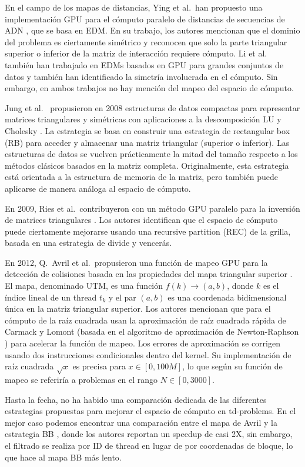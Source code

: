 \documentclass[twocolumn,10pt,a4paper]{article}
\begin{document}
En el campo de los mapas de distancias, Ying et al.\ han propuesto una
implementación GPU para el cómputo paralelo de distancias de secuencias de
ADN \cite{ref17}, que se basa en EDM. En su trabajo, los autores mencionan
que el dominio del problema es ciertamente simétrico y reconocen que solo la
parte triangular superior o inferior de la matriz de interacción requiere
cómputo. Li et al.\ \cite{ref8} también han trabajado en EDMs basados en GPU
para grandes conjuntos de datos y también han identificado la simetría
involucrada en el cómputo. Sin embargo, en ambos trabajos no hay mención del
mapeo del espacio de cómputo.

Jung et al.\ \cite{ref5} propusieron en 2008 estructuras de datos compactas
para representar matrices triangulares y simétricas con aplicaciones a la
descomposición LU y Cholesky \cite{ref4}. La estrategia se basa en construir
una estrategia de rectangular box (RB) para acceder y almacenar una matriz
triangular (superior o inferior). Las estructuras de datos se vuelven
prácticamente la mitad del tamaño respecto a los métodos clásicos basados en
la matriz completa. Originalmente, esta estrategia está orientada a la
estructura de memoria de la matriz, pero también puede aplicarse de manera
análoga al espacio de cómputo.

En 2009, Ries et al.\ contribuyeron con un método GPU paralelo para la
inversión de matrices triangulares \cite{ref16}. Los autores identifican que
el espacio de cómputo puede ciertamente mejorarse usando una recursive
partition (REC) de la grilla, basada en una estrategia de divide y vencerás.

En 2012, Q.~Avril et al.\ propusieron una función de mapeo GPU para la
detección de colisiones basada en las propiedades del mapa triangular superior
\cite{ref1}. El mapa, denominado UTM, es una función
$f(k) \rightarrow (a, b)$, donde $k$ es el índice lineal de un thread $t_k$
y el par $(a, b)$ es una coordenada bidimensional única en la matriz
triangular superior. Los autores mencionan que para el cómputo de la raíz
cuadrada usan la aproximación de raíz cuadrada rápida de Carmack y Lomont
(basada en el algoritmo de aproximación de Newton-Raphson \cite{ref15}) para
acelerar la función de mapeo. Los errores de aproximación se corrigen
usando dos instrucciones condicionales dentro del kernel. Su implementación
de raíz cuadrada $\sqrt{x}$ es precisa para $x \in [0, 100M]$, lo que según
su función de mapeo se referiría a problemas en el rango $N \in [0, 3000]$.

Hasta la fecha, no ha habido una comparación dedicada de las diferentes
estrategias propuestas para mejorar el espacio de cómputo en td-problems. En
el mejor caso podemos encontrar una comparación entre el mapa de Avril y la
estrategia BB \cite{ref1}, donde los autores reportan un speedup de casi 2X,
sin embargo, el filtrado se realiza por ID de thread en lugar de por
coordenadas de bloque, lo que hace al mapa BB más lento.
\end{document}
